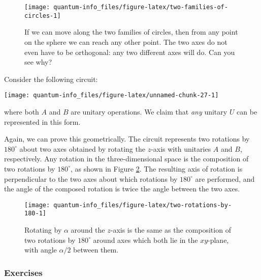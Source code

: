 \documentclass[fleqn]{article}
\begin{document}
\begin{figure}[H]

{\centering \texttt{[image: quantum-info\_files/figure-latex/two-families-of-circles-1]} 

}

\caption{If we can move along the two families of circles, then from any point on the sphere we can reach any other point. The two axes do not even have to be orthogonal: any two different axes will do. Can you see why?}\label{fig:two-families-of-circles}
\end{figure}

Consider the following circuit:

\begin{center}\texttt{[image: quantum-info\_files/figure-latex/unnamed-chunk-27-1]} \end{center}

where both \(A\) and \(B\) are unitary operations.
We claim that \emph{any} unitary \(U\) can be represented in this form.

Again, we can prove this geometrically.
The circuit represents two rotations by \(180^\circ\) about two axes obtained by rotating the \(z\)-axis with unitaries \(A\) and \(B\), respectively.
Any rotation in the three-dimensional space is the composition of two rotations by \(180^\circ\), as shown in Figure \ref{fig:two-rotations-by-180}.
The resulting axis of rotation is perpendicular to the two axes about which rotations by \(180^\circ\) are performed, and the angle of the composed rotation is twice the angle between the two axes.



\begin{figure}[H]

{\centering \texttt{[image: quantum-info\_files/figure-latex/two-rotations-by-180-1]} 

}

\caption{Rotating by \(\alpha\) around the \(z\)-axis is the same as the composition of two rotations by \(180^\circ\) around axes which both lie in the \(xy\)-plane, with angle \(\alpha/2\) between them.}\label{fig:two-rotations-by-180}
\end{figure}

\hypertarget{exercises-4}{%
\subsubsection{Exercises}\label{exercises-4}}
\end{document}
